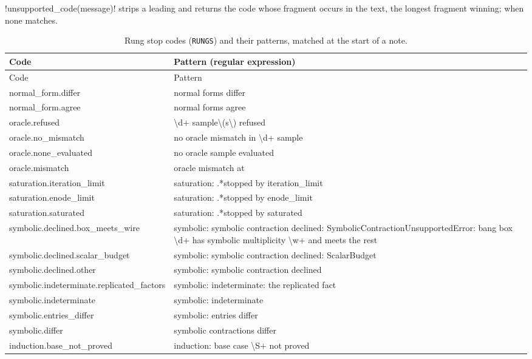 \py!unsupported_code(message)! strips a leading  and returns the
code whose fragment occurs in the text, the longest fragment winning;  when none
matches.

{\small
\begin{xltabular}{\textwidth}{@{}>{\ttfamily}p{0.5\textwidth} >{\ttfamily}X@{}}
\caption{Rung stop codes (\texttt{RUNGS}) and their patterns, matched at the start of a note.}\label{tab:bench-rungs}\\
\toprule
\normalfont Code & \normalfont Pattern (regular expression)\\
\midrule\endfirsthead
\toprule
\normalfont Code & \normalfont Pattern\\
\midrule\endhead
\bottomrule\endfoot
normal\_form.differ & normal forms differ\\
normal\_form.agree & normal forms agree\\
oracle.refused & \textbackslash d+ sample\textbackslash(s\textbackslash) refused\\
oracle.no\_mismatch & no oracle mismatch in \textbackslash d+ sample\\
oracle.none\_evaluated & no oracle sample evaluated\\
oracle.mismatch & oracle mismatch at\\
saturation.iteration\_limit & saturation: .*stopped by iteration\_limit\\
saturation.enode\_limit & saturation: .*stopped by enode\_limit\\
saturation.saturated & saturation: .*stopped by saturated\\
symbolic.declined.box\_meets\_wire & symbolic: symbolic contraction declined:
  SymbolicContractionUnsupportedError: bang box \textbackslash d+ has symbolic multiplicity
  \textbackslash w+ and meets the rest\\
symbolic.declined.scalar\_budget & symbolic: symbolic contraction declined: ScalarBudget\\
symbolic.declined.other & symbolic: symbolic contraction declined\\
symbolic.indeterminate.replicated\_factors & symbolic: indeterminate: the replicated fact\\
symbolic.indeterminate & symbolic: indeterminate\\
symbolic.entries\_differ & symbolic: entries differ\\
symbolic.differ & symbolic contractions differ\\
induction.base\_not\_proved & induction: base case \textbackslash S+ not proved\\

\end{xltabular}}
